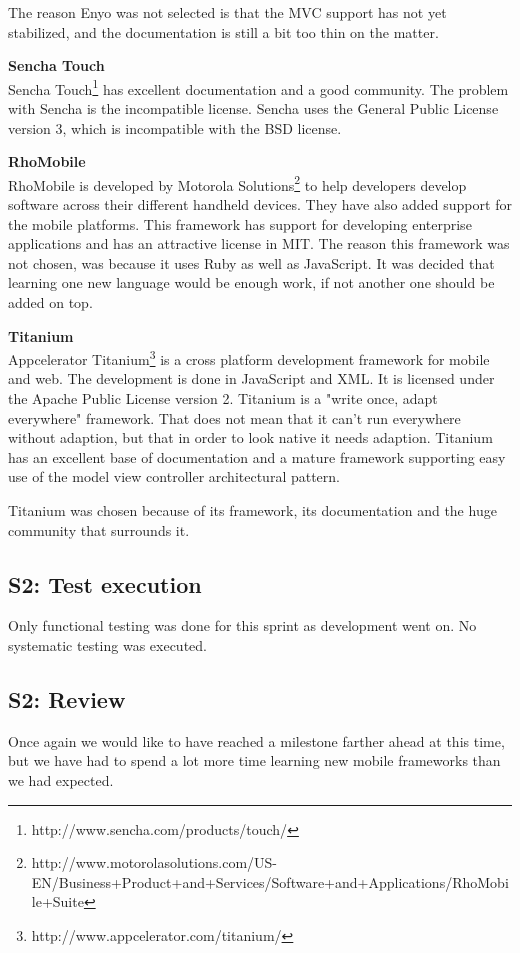 \documentclass[11pt]{book}
\begin{document}
The reason Enyo was not selected is that the MVC support has not yet stabilized, and the documentation is still a bit too thin on the matter.

\textbf{Sencha Touch}\\
Sencha Touch\footnote{http://www.sencha.com/products/touch/} has excellent documentation and a good community. The problem with Sencha is the incompatible license. Sencha uses the General Public License version 3, which is incompatible with the BSD license.\cite{flossLicense}

\textbf{RhoMobile}\\
RhoMobile is developed by Motorola Solutions\footnote{http://www.motorolasolutions.com/US-EN/Business+Product+and+Services/Software+and+Applications/RhoMobile+Suite} to help developers develop software across their different handheld devices. They have also added support for the mobile platforms. This framework has support for developing enterprise applications and has an attractive license in MIT.
The reason this framework was not chosen, was because it uses Ruby as well as JavaScript. It was decided that learning one new language would be enough work, if not another one should be added on top.

\textbf{Titanium}\\
Appcelerator Titanium\footnote{http://www.appcelerator.com/titanium/} is a cross platform development framework for mobile and web. The development is done in JavaScript and XML. It is licensed under the Apache Public License version 2. Titanium is a "write once, adapt everywhere" framework\cite{titaniumCrossMobile}. That does not mean that it can’t run everywhere without adaption, but that in order to look native it needs adaption. Titanium has an excellent base of documentation and a mature framework supporting easy use of the model view controller architectural pattern.

Titanium was chosen because of its framework, its documentation and the huge community that surrounds it.


\subsection{S2: Test execution}
Only functional testing was done for this sprint as development went on. No systematic testing was executed.

\subsection{S2: Review}
Once again we would like to have reached a milestone farther ahead at this time, but we have had to spend a lot more time learning new mobile frameworks than we had expected. 
\end{document}

